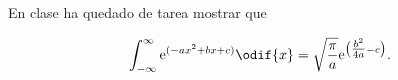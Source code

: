 \documentclass[../main.tex]{subfiles}
\begin{document}
\begin{problema}
	En clase ha quedado de tarea mostrar que

	\begin{equation*}
		\int_{-\infty}^{\infty} \mathrm{e}^{( -ax^{2} + bx + c )} \odif{x} = \sqrt{\dfrac{\pi}{a}}
		\mathrm{e}^{\bigl(\tfrac{b^{2}}{4a} - c\bigr)}.
	\end{equation*}
\end{problema}
\end{document}
